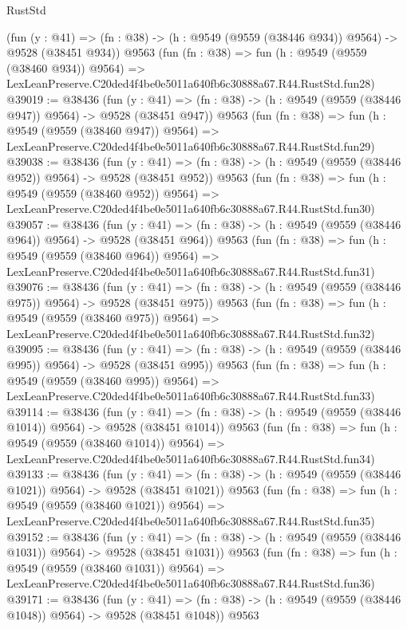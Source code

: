 \begin{lexlean}{RustStd}
\begin{coremodule}
    (fun (y : @41) => (fn : @38) -> (h : @9549 (@9559 (@38446 @934)) @9564) -> @9528 (@38451 @934))
    @9563
    (fun (fn : @38) =>
    fun (h : @9549 (@9559 (@38460 @934)) @9564) =>
    LexLeanPreserve.C20ded4f4be0e5011a640fb6c30888a67.R44.RustStd.fun28)
@39019 := @38436
    (fun (y : @41) => (fn : @38) -> (h : @9549 (@9559 (@38446 @947)) @9564) -> @9528 (@38451 @947))
    @9563
    (fun (fn : @38) =>
    fun (h : @9549 (@9559 (@38460 @947)) @9564) =>
    LexLeanPreserve.C20ded4f4be0e5011a640fb6c30888a67.R44.RustStd.fun29)
@39038 := @38436
    (fun (y : @41) => (fn : @38) -> (h : @9549 (@9559 (@38446 @952)) @9564) -> @9528 (@38451 @952))
    @9563
    (fun (fn : @38) =>
    fun (h : @9549 (@9559 (@38460 @952)) @9564) =>
    LexLeanPreserve.C20ded4f4be0e5011a640fb6c30888a67.R44.RustStd.fun30)
@39057 := @38436
    (fun (y : @41) => (fn : @38) -> (h : @9549 (@9559 (@38446 @964)) @9564) -> @9528 (@38451 @964))
    @9563
    (fun (fn : @38) =>
    fun (h : @9549 (@9559 (@38460 @964)) @9564) =>
    LexLeanPreserve.C20ded4f4be0e5011a640fb6c30888a67.R44.RustStd.fun31)
@39076 := @38436
    (fun (y : @41) => (fn : @38) -> (h : @9549 (@9559 (@38446 @975)) @9564) -> @9528 (@38451 @975))
    @9563
    (fun (fn : @38) =>
    fun (h : @9549 (@9559 (@38460 @975)) @9564) =>
    LexLeanPreserve.C20ded4f4be0e5011a640fb6c30888a67.R44.RustStd.fun32)
@39095 := @38436
    (fun (y : @41) => (fn : @38) -> (h : @9549 (@9559 (@38446 @995)) @9564) -> @9528 (@38451 @995))
    @9563
    (fun (fn : @38) =>
    fun (h : @9549 (@9559 (@38460 @995)) @9564) =>
    LexLeanPreserve.C20ded4f4be0e5011a640fb6c30888a67.R44.RustStd.fun33)
@39114 := @38436
    (fun (y : @41) =>
    (fn : @38) -> (h : @9549 (@9559 (@38446 @1014)) @9564) -> @9528 (@38451 @1014))
    @9563
    (fun (fn : @38) =>
    fun (h : @9549 (@9559 (@38460 @1014)) @9564) =>
    LexLeanPreserve.C20ded4f4be0e5011a640fb6c30888a67.R44.RustStd.fun34)
@39133 := @38436
    (fun (y : @41) =>
    (fn : @38) -> (h : @9549 (@9559 (@38446 @1021)) @9564) -> @9528 (@38451 @1021))
    @9563
    (fun (fn : @38) =>
    fun (h : @9549 (@9559 (@38460 @1021)) @9564) =>
    LexLeanPreserve.C20ded4f4be0e5011a640fb6c30888a67.R44.RustStd.fun35)
@39152 := @38436
    (fun (y : @41) =>
    (fn : @38) -> (h : @9549 (@9559 (@38446 @1031)) @9564) -> @9528 (@38451 @1031))
    @9563
    (fun (fn : @38) =>
    fun (h : @9549 (@9559 (@38460 @1031)) @9564) =>
    LexLeanPreserve.C20ded4f4be0e5011a640fb6c30888a67.R44.RustStd.fun36)
@39171 := @38436
    (fun (y : @41) =>
    (fn : @38) -> (h : @9549 (@9559 (@38446 @1048)) @9564) -> @9528 (@38451 @1048))
    @9563

\end{coremodule}
\end{lexlean}
